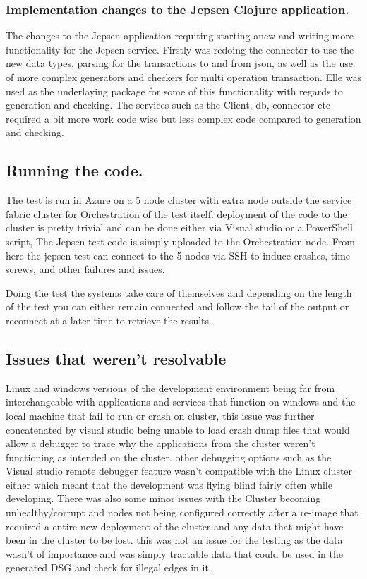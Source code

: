 \documentclass[a4paper,10pt,titlepage]{report}
\begin{document}
     \subsubsection{Implementation changes to the Jepsen Clojure application.}

The changes to the Jepsen application requiting starting anew and writing more functionality for the Jepsen service. Firstly was redoing the connector to use the new data types, parsing for the transactions to and from json, as well as the use of more complex generators and checkers for multi operation transaction. Elle was used as the underlaying package for some of this functionality with regards to generation and checking. The services such as the Client, db, connector etc required a bit more work code wise but less complex code compared to generation and checking.


\subsection{Running the code.}

    The test is run in Azure on a 5 node cluster with extra node outside the service fabric cluster for Orchestration of the test itself. deployment of the code to the cluster is pretty trivial and can be done either via Visual studio or a PowerShell script, The Jepsen test code is simply uploaded to the Orchestration node. From here the jepsen test can connect to the 5 nodes via SSH to induce crashes, time screws, and other failures and issues.
    
    Doing the test the systems take care of themselves and depending on the length of the test you can either remain connected and follow the tail of the output or reconnect at a later time to retrieve the results.


    \subsection{Issues that weren't resolvable}
    
    Linux and windows versions of the development environment being far from interchangeable with applications and services that function on windows and the local machine that fail to run or crash on cluster, this issue was further concatenated by visual studio being unable to load crash dump files that would allow a debugger to trace why the applications from the cluster weren't functioning as intended on the cluster. other debugging options such as the  Visual studio remote debugger feature wasn't compatible with the Linux cluster either which meant that the development was flying blind fairly often while developing. There was also some minor issues with the Cluster becoming unhealthy/corrupt and nodes not being configured correctly after a re-image that required a entire new deployment of the cluster and any data that might have been in the cluster to be lost. this was not an issue for the testing as the data wasn't of importance and was simply tractable data that could be used in the generated DSG and check for illegal edges in it.
    
\end{document}
